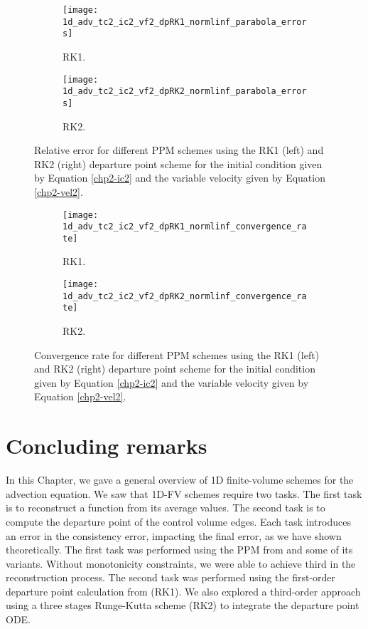 \begin{figure}[!htb]
  \centering
  \begin{subfigure}{0.49\textwidth}
    \centering
		\texttt{[image: 1d\_adv\_tc2\_ic2\_vf2\_dpRK1\_normlinf\_parabola\_errors]}
		\caption{RK1.\label{chp2-sec-exp-adv6-error-rk1}}
  \end{subfigure}
  \begin{subfigure}{0.49\textwidth}
    \centering
			\texttt{[image: 1d\_adv\_tc2\_ic2\_vf2\_dpRK2\_normlinf\_parabola\_errors]}
		\caption{RK2.\label{chp2-sec-exp-adv6-rl3}}
  \end{subfigure}
	\caption{ Relative error for different PPM schemes using the RK1 (left) and RK2 (right)
	departure point scheme for the initial condition given by Equation
	\eqref{chp2-ic2} and the variable 
	velocity given by Equation \eqref{chp2-vel2}.\label{chp2-sec-exp-adv6-2}}
\end{figure}

\begin{figure}[!htb]
	\centering
	\begin{subfigure}{0.49\textwidth}
		\centering
		\texttt{[image: 1d\_adv\_tc2\_ic2\_vf2\_dpRK1\_normlinf\_convergence\_rate]}
		\caption{RK1.\label{chp2-sec-exp-adv6-cr-rk1}}
	\end{subfigure}
	\begin{subfigure}{0.49\textwidth}
		\centering
		\texttt{[image: 1d\_adv\_tc2\_ic2\_vf2\_dpRK2\_normlinf\_convergence\_rate]}
		\caption{RK2.\label{chp2-sec-exp-adv6-cf-RK2}}
	\end{subfigure}
	\caption{ Convergence rate for different PPM schemes using the RK1 (left) and RK2 (right)
	departure point scheme for the initial condition given by Equation
	\eqref{chp2-ic2} and the variable 
	velocity given by Equation \eqref{chp2-vel2}.\label{chp2-sec-exp-adv6-3}}
\end{figure}

\section{Concluding remarks}
\label{chp2-sec-conclusion}
In this Chapter, we gave a general overview of 1D finite-volume schemes for the
advection equation. We saw that 1D-FV schemes require two tasks. 
The first task is to reconstruct a function from its average values. 
The second task is to compute the departure point of the control volume edges.
Each task introduces an error in the consistency error, impacting the final error, 
as we have shown theoretically.
The first task was performed using the PPM from \citet{colella:1984} 
and some of its variants. Without monotonicity constraints, we were able to 
achieve third in the reconstruction process.
The second task was performed using the first-order departure point calculation from
\citet{colella:1984} (RK1). We also explored a third-order approach using a three stages
Runge-Kutta scheme (RK2) to integrate the departure point ODE.

